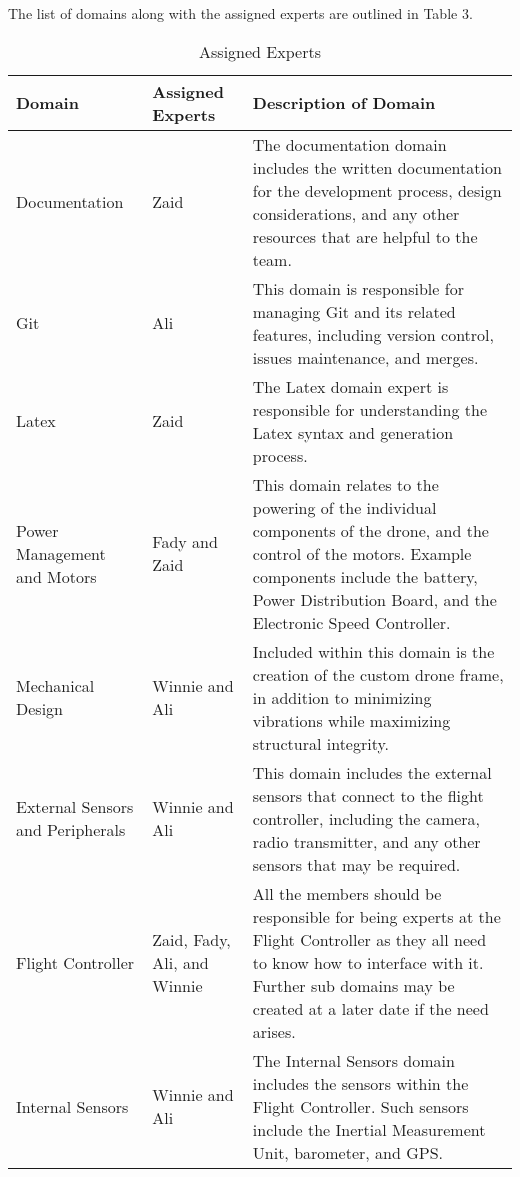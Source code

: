 \documentclass{article}
\begin{document}
The list of domains along with the assigned experts are outlined in Table 3.
\\
\begin{table}[!h]
\caption {Assigned Experts} \label{tab:title}
\begin{center}
\begin{tabular}{ | m{3cm} | m{3cm} | m{8cm} | }
\hline
Domain & Assigned Experts & Description of Domain \\
\hline
Documentation & Zaid & The documentation domain includes the written documentation for the development process, design considerations, and any other resources that are helpful to the team. \\
\hline
Git & Ali & This domain is responsible for managing Git and its related features, including version control, issues maintenance, and merges.\\
\hline
Latex & Zaid & The Latex domain expert is responsible for understanding the Latex syntax and generation process. \\
\hline
Power Management and Motors & Fady and Zaid & This domain relates to the powering of the individual components of the drone, and the control of the motors. Example components include the battery, Power Distribution Board, and the Electronic Speed Controller. \\
\hline
Mechanical Design & Winnie and Ali & Included within this domain is the creation of the custom drone frame, in addition to minimizing vibrations while maximizing structural integrity. \\
\hline
External Sensors and Peripherals & Winnie and Ali & This domain includes the external sensors that connect to the flight controller, including the camera, radio transmitter, and any other sensors that may be required. \\
\hline
Flight Controller & Zaid, Fady, Ali, and Winnie & All the members should be responsible for being experts at the Flight Controller as they all need to know how to interface with it. Further sub domains may be created at a later date if the need arises. \\
\hline
Internal Sensors & Winnie and Ali & The Internal Sensors domain includes the sensors within the Flight Controller. Such sensors include the Inertial Measurement Unit, barometer, and GPS. \\
\hline
\end{tabular}
\end{center}
\end{table}
\end{document}
